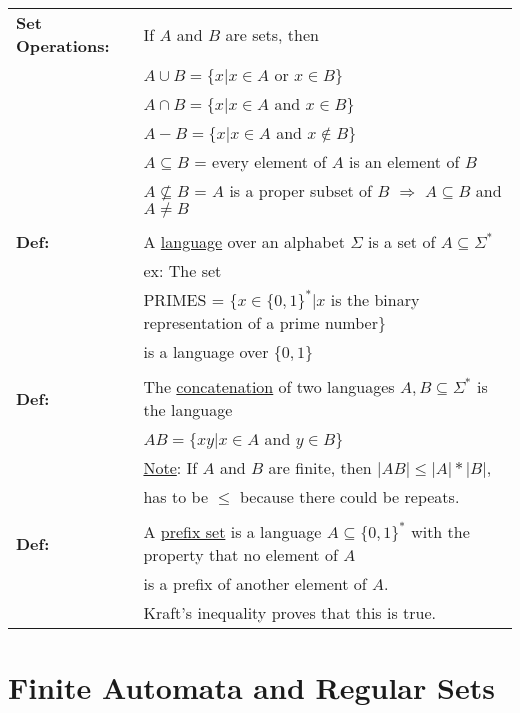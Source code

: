 \documentclass[11pt]{article}
\begin{document}
\begin{tabular}{ll}
{\bf Set Operations:} & If $A$ and $B$ are sets, then \\
& $A \cup B = \{x|x\in A $ or $x \in B\}$ \\
& $A \cap B = \{x|x\in A $ and $x \in B\}$ \\
& $A - B = \{x|x\in A $ and $x \not\in B\}$ \\
& $A \subseteq B$ = every element of $A$ is an element of $B$ \\
& $A \not\subseteq B$ = $A$ is a proper subset of $B$ $\Rightarrow$ $A \subseteq B$ and $A \neq B$\\
\\
{\bf Def:} & A \underline{language} over an alphabet $\Sigma$ is a set of $A \subseteq \Sigma^*$ \\
& ex: The set \\
& PRIMES = $\{x\in\{0,1\}^*|x$ is the binary representation of a prime number$\}$ \\
& is a language over $\{0,1\}$\\
\\
{\bf Def:} & The \underline{concatenation} of two languages $A,B\subseteq\Sigma^*$ is the language \\
& $AB = \{xy|x\in A$ and $y\in B\}$\\
& \underline{Note}: If $A$ and $B$ are finite, then $|AB| \leqslant |A| * |B|$, \\
& has to be $\leqslant$ because there could be repeats. \\
\\
{\bf Def:} & A \underline{prefix set} is a language $A \subseteq \{0,1\}^*$ with the property that no element of $A$ \\
& is a prefix of another element of $A$. \\
& Kraft's inequality proves that this is true. \\
\end{tabular}

\section{Finite Automata and Regular Sets}
\end{document}
